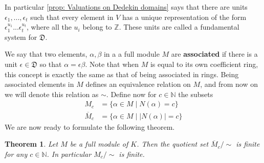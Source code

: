 \documentclass{article}
\newtheorem{theorem}{Theorem}[section]
\newcommand{\mfrak}[1]{\mathfrak{#1}}
\newcommand{\mbb}[1]{\mathbb{#1}}
\begin{document}
In particular \ref{prop: Valuations on Dedekin domains} says that there are units $\epsilon_1, ..., \epsilon_t$ such that every element in $V$ has a unique representation of the form $\epsilon_1^{u_1}...\epsilon_t^{u_t}$, where all the $u_i$ belong to $\mbb Z$. These units are called a fundamental system for $\mfrak D$.  

We say that two elements, $\alpha,\beta$ in a a full module $M$ are \textbf{associated} if there is a unit $\epsilon \in \mfrak D$ so that $\alpha = \epsilon \beta$. Note that when $M$ is equal to its own coefficient ring, this concept is exactly the same as that of being associated in rings. Being associated elements in $M$ defines an equivalence relation on $M$, and from now on we will denote this relation as $\sim$. Define now for $c \in \mbb N$ the subsets
\begin{align*}
    M_c &= \{ \alpha \in M \mid N(\alpha) = c\} \\
    \overline M_c &= \{ \alpha \in M \mid | N(\alpha) | = c\}
\end{align*}
We are now ready to formulate the following theorem.
\begin{theorem} 
    Let $M$ be a full module of $K$. Then the quotient set $\overline M_c / \sim$ is finite for any $c \in \mbb N$. In particular $M_c / \sim$ is finite.
\end{theorem}
\end{document}
